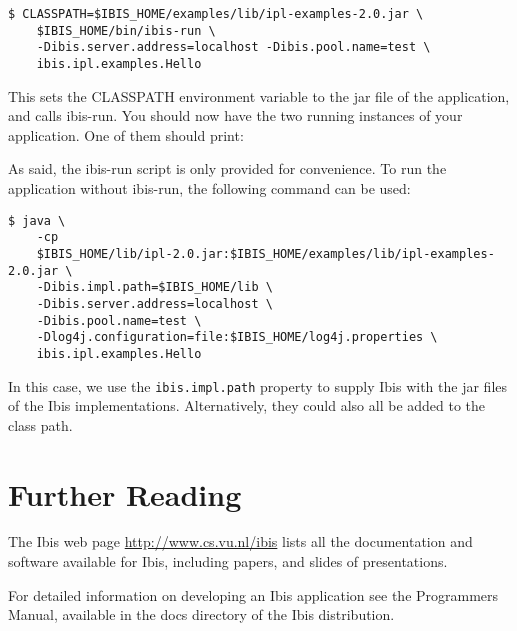 \documentclass[10pt]{article}
\begin{document}
\noindent
{\small
\begin{verbatim}
$ CLASSPATH=$IBIS_HOME/examples/lib/ipl-examples-2.0.jar \
    $IBIS_HOME/bin/ibis-run \
    -Dibis.server.address=localhost -Dibis.pool.name=test \
    ibis.ipl.examples.Hello
\end{verbatim}
}
\noindent

This sets the CLASSPATH environment variable to the jar file of the
application, and calls ibis-run. You should now have the two running
instances of your application. One of them should print:

\noindent {\small \begin{verbatim} Server received: Hi there
\end{verbatim} } \noindent 

As said, the ibis-run script is only provided for convenience. To run
the application without ibis-run, the following command can be used:

\noindent
{\small
\begin{verbatim}
$ java \
    -cp
    $IBIS_HOME/lib/ipl-2.0.jar:$IBIS_HOME/examples/lib/ipl-examples-2.0.jar \
    -Dibis.impl.path=$IBIS_HOME/lib \
    -Dibis.server.address=localhost \
    -Dibis.pool.name=test \
    -Dlog4j.configuration=file:$IBIS_HOME/log4j.properties \
    ibis.ipl.examples.Hello
\end{verbatim}
}
\noindent

In this case, we use the \texttt{ibis.impl.path} property to supply Ibis
with the jar files of the Ibis implementations. Alternatively, they
could also all be added to the class path.

\section{Further Reading}

The Ibis web page \url{http://www.cs.vu.nl/ibis} lists all
the documentation and software available for Ibis, including papers, and
slides of presentations.

For detailed information on developing an Ibis application see the
Programmers Manual, available in the docs directory of the Ibis
distribution.
\end{document}
